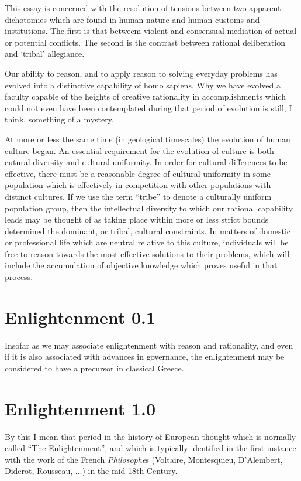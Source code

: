 \documentclass[10pt,titlepage]{book}
\begin{document}
This essay is concerned with the resolution of tensions between two apparent dichotomies which are found in human nature and human customs and institutions.
The first is that betweem violent and consensual mediation of actual or potential conflicts.
The second is the contrast between rational deliberation and `tribal' allegiance.

Our ability to reason, and to apply reason to solving everyday problems has evolved into a distinctive capability of homo sapiens.
Why we have evolved a faculty capable of the heights of creative rationality in accomplishments which could not even have been contemplated during that period of evolution is still, I think, something of a mystery.

At more or less the same time (in geological timescales) the evolution of human culture began.
An essential requirement for the evolution of culture is both cutural diversity and cultural uniformity.
In order for cultural differences to be effective, there must be a reasonable degree of cultural uniformity in some population which is effectively in competition with other populations with distinct cultures.
If we use the term ``tribe'' to denote a culturally uniform population group, then the intellectual diversity to which our rational capability leads may be thought of as taking place within more or less strict bounds determined the dominant, or tribal, cultural constraints.
In matters of domestic or professional life which are neutral relative to this culture, individuals will be free to reason towards the most effective solutions to their problems, which will include the accumulation of objective knowledge which proves useful in that process.





\section{Enlightenment 0.1}

Insofar as we may associate enlightenment with reason and rationality, and even if it is also associated with advances in governance, the enlightenment may be considered to have a precursor in classical Greece.

\section{Enlightenment 1.0}

By this I mean that period in the history of European thought which is normally called ``The Enlightenment'', and which is typically identified in the first instance with the work of the French \emph{Philosophe}s (Voltaire, Montesquieu, D'Alembert, Diderot, Rousseau, ...) in the mid-18th Century.
\end{document}
